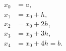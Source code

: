 \begin{align} x_0 &= a, \\ x_1 &= x_0 + h, \\ x_2 &= x_0 + 2h, \\ x_3 &= x_0 + 3h, \\ x_4 &= x_0 + 4h = b. \end{align}
